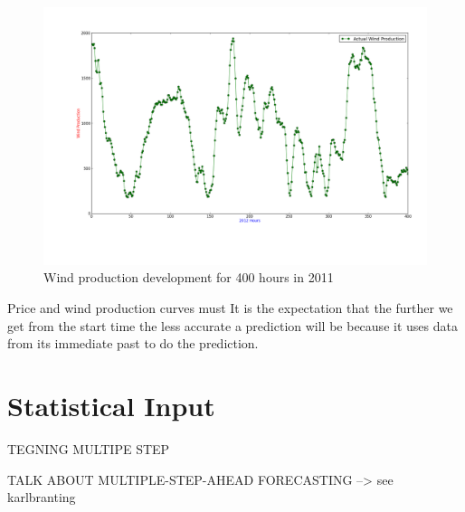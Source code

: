 \begin{figure}[H]
\centering
\includegraphics[width=0.99\linewidth,natwidth=898,natheight=587]{billeder/productionTendency400Hours.png}
\caption{Wind production development for 400 hours in 2011}
\label{fig:windHourDevelopment400Hours}
\end{figure}


Price and wind production curves must 
It is the expectation that the further we get from the start time the less accurate a prediction will be because it uses data from its immediate past to do the prediction. 


\section{Statistical Input}

TEGNING MULTIPE STEP

TALK ABOUT MULTIPLE-STEP-AHEAD FORECASTING --> see karlbranting